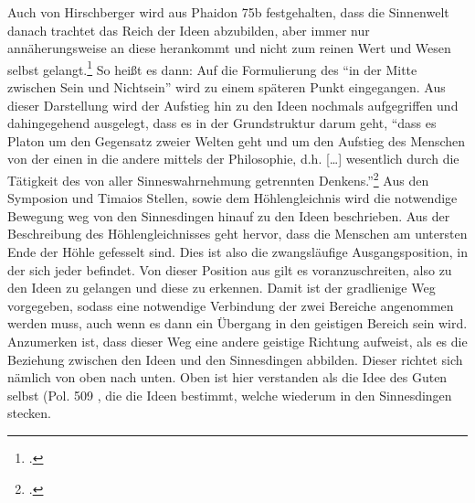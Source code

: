 Auch von Hirschberger wird aus Phaidon 75b festgehalten, dass die Sinnenwelt danach trachtet das Reich der Ideen abzubilden, aber immer nur annäherungsweise an diese herankommt und nicht zum reinen Wert und Wesen selbst gelangt.\footcite[vgl.][S. 100]{Hirschberger} So heißt es dann:
Auf die Formulierung des \enquote{in der Mitte zwischen Sein und Nichtsein} wird zu einem späteren Punkt eingegangen.
Aus dieser Darstellung wird der Aufstieg hin zu den Ideen nochmals aufgegriffen und dahingegehend ausgelegt, dass es in der Grundstruktur darum geht, \enquote{dass es Platon um den Gegensatz zweier Welten geht und um den Aufstieg des Menschen von der einen in die andere mittels der Philosophie, d.h. [\dots] wesentlich durch die Tätigkeit des von aller Sinneswahrnehmung getrennten Denkens.}\footcite[vgl.][S. 29]{DisseMetaphysik}
Aus den Symposion und Timaios Stellen, sowie dem Höhlengleichnis wird die notwendige Bewegung weg von den Sinnesdingen hinauf zu den Ideen beschrieben. Aus der Beschreibung des Höhlengleichnisses geht hervor, dass die Menschen am untersten Ende der Höhle gefesselt sind. Dies ist also die zwangsläufige Ausgangsposition, in der sich jeder befindet. Von dieser Position aus gilt es voranzuschreiten, also zu den Ideen zu gelangen und diese zu erkennen. Damit ist der gradlienige Weg vorgegeben, sodass eine notwendige Verbindung der zwei Bereiche angenommen werden muss, auch wenn es dann ein Übergang in den geistigen Bereich sein wird. 
Anzumerken ist, dass dieser Weg eine andere geistige Richtung aufweist, als es die Beziehung zwischen den Ideen und den Sinnesdingen abbilden.
Dieser richtet sich nämlich von oben nach unten. Oben ist hier verstanden als die Idee des Guten selbst (Pol. 509 
, die die Ideen bestimmt, welche wiederum in den Sinnesdingen stecken.
